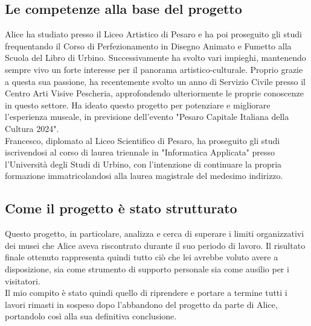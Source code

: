 \documentclass[hidelinks,12pt,a4paper]{article}
\begin{document}
\begin{flushleft}
        \subsection{Le competenze alla base del progetto}
        Alice ha studiato presso il Liceo Artistico di Pesaro e ha poi proseguito gli studi frequentando il Corso di Perfezionamento in Disegno Animato e Fumetto alla Scuola del Libro di Urbino. Successivamente ha svolto vari impieghi, mantenendo sempre vivo un forte interesse per il panorama artistico-culturale. Proprio grazie a questa sua passione, ha recentemente svolto un anno di Servizio Civile presso il Centro Arti Visive Pescheria, approfondendo ulteriormente le proprie conoscenze in questo settore. Ha ideato questo progetto per potenziare e migliorare l'esperienza museale, in previsione dell'evento "Pesaro Capitale Italiana della Cultura 2024".\\
        Francesco, diplomato al Liceo Scientifico di Pesaro, ha proseguito gli studi iscrivendosi al corso di laurea triennale in "Informatica Applicata" presso l'Università degli Studi di Urbino, con l'intenzione di continuare la propria formazione immatricolandosi alla laurea magistrale del medesimo indirizzo.  


        \subsection{Come il progetto è stato strutturato}
        Questo progetto, in particolare, analizza e cerca di superare i limiti organizzativi dei musei che Alice aveva riscontrato durante il suo periodo di lavoro. Il risultato finale ottenuto rappresenta quindi tutto ciò che lei avrebbe voluto avere a disposizione, sia come strumento di supporto personale sia come ausilio per i visitatori.\\
        Il mio compito è stato quindi quello di riprendere e portare a termine tutti i lavori rimasti in sospeso dopo l'abbandono del progetto da parte di Alice, portandolo così alla sua definitiva conclusione.
        

\end{flushleft}
\end{document}
